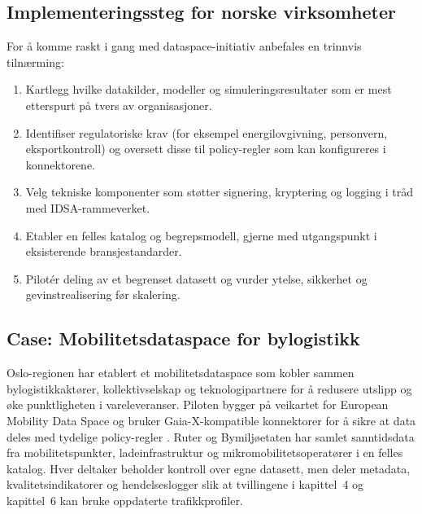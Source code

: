 \subsection{Implementeringssteg for norske virksomheter}
For å komme raskt i gang med dataspace-initiativ anbefales en trinnvis tilnærming:
\begin{enumerate}
    \item Kartlegg hvilke datakilder, modeller og simuleringsresultater som er mest etterspurt på tvers av organisasjoner.
    \item Identifiser regulatoriske krav (for eksempel energilovgivning, personvern, eksportkontroll) og oversett disse til
    policy-regler som kan konfigureres i konnektorene.
    \item Velg tekniske komponenter som støtter signering, kryptering og logging i tråd med IDSA-rammeverket.
    \item Etabler en felles katalog og begrepsmodell, gjerne med utgangspunkt i eksisterende bransjestandarder.
    \item Pilotér deling av et begrenset datasett og vurder ytelse, sikkerhet og gevinstrealisering før skalering.
\end{enumerate}

\subsection{Case: Mobilitetsdataspace for bylogistikk}
Oslo-regionen har etablert et mobilitetsdataspace som kobler sammen bylogistikkaktører, kollektivselskap og teknologipartnere
for å redusere utslipp og øke punktligheten i vareleveranser. Piloten bygger på veikartet for European Mobility Data Space og
bruker Gaia-X-kompatible konnektorer for å sikre at data deles med tydelige policy-regler \citep{ec2023mobilitydataspaceblueprint}.
Ruter og Bymiljøetaten har samlet sanntidsdata fra mobilitetspunkter, ladeinfrastruktur og mikromobilitetsoperatører i en
felles katalog. Hver deltaker beholder kontroll over egne datasett, men deler metadata, kvalitetsindikatorer og hendelseslogger
slik at tvillingene i kapittel~4 og kapittel~6 kan bruke oppdaterte trafikkprofiler.

